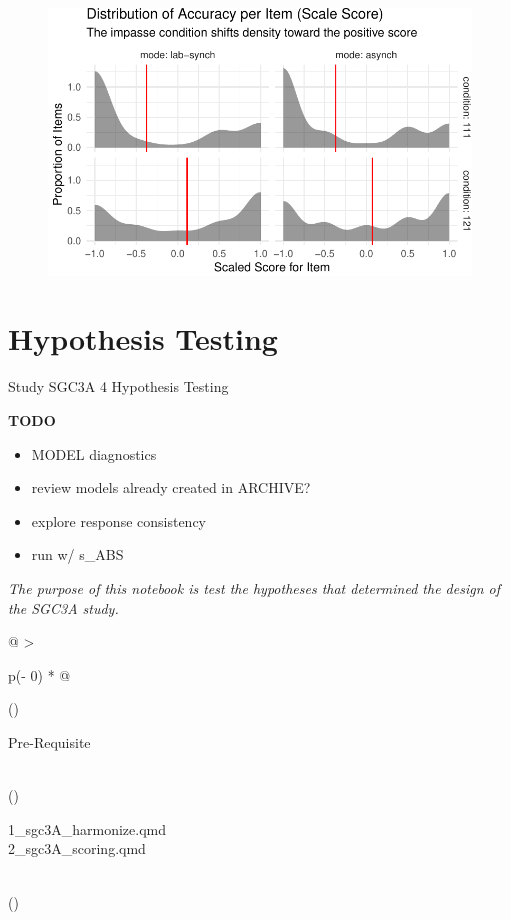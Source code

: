 \documentclass[
  letterpaper,
  DIV=11,
  numbers=noendperiod]{scrreprt}
\providecommand{\tightlist}{%
  \setlength{\itemsep}{0pt}\setlength{\parskip}{0pt}}\usepackage{longtable,booktabs,array}
\begin{document}
\begin{figure}[H]

{\centering \includegraphics{analysis/SGC3A/3_sgc3A_description_files/figure-pdf/unnamed-chunk-26-1.pdf}

}

\end{figure}

\hypertarget{sec-SGC3A-hypotesting}{%
\chapter{Hypothesis Testing}\label{sec-SGC3A-hypotesting}}

Study SGC3A \textbar{} 4 Hypothesis Testing

\hfill\break

\newpage

\textbf{TODO}

\begin{itemize}
\tightlist
\item
  MODEL diagnostics
\item
  review models already created in ARCHIVE?
\item
  explore response consistency
\item
  run w/ s\_ABS
\end{itemize}

\emph{The purpose of this notebook is test the hypotheses that
determined the design of the SGC3A study.}

\begin{longtable}[]{@{}
  >{\raggedright\arraybackslash}p{(\columnwidth - 0\tabcolsep) * }@{}}
\toprule()
\begin{minipage}[b]{\linewidth}\raggedright
Pre-Requisite
\end{minipage} \\
\midrule()
\endhead
\begin{minipage}[t]{\linewidth}\raggedright
1\_sgc3A\_harmonize.qmd\\
2\_sgc3A\_scoring.qmd\strut
\end{minipage} \\
\bottomrule()
\end{longtable}
\end{document}
